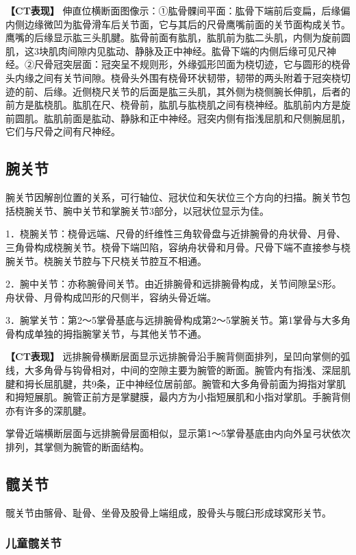 \textbf{【CT表现】}
伸直位横断面图像示：①肱骨髁间平面：肱骨下端前后变扁，后缘偏内侧边缘微凹为肱骨滑车后关节面，它与其后的尺骨鹰嘴前面的关节面构成关节。鹰嘴的后缘显示肱三头肌腱。肱骨前面有肱肌，肱肌前为肱二头肌，内侧为旋前圆肌，这3块肌肉间隙内见肱动、静脉及正中神经。肱骨下端的内侧后缘可见尺神经。②尺骨冠突层面：冠突呈不规则形，外缘弧形凹面为桡切迹，它与圆形的桡骨头内缘之间有关节间隙。桡骨头外围有桡骨环状韧带，韧带的两头附着于冠突桡切迹的前、后缘。近侧桡尺关节的后面是肱三头肌，其外侧为桡侧腕长伸肌，后者的前方是肱桡肌。肱肌在尺、桡骨前，肱肌与肱桡肌之间有桡神经。肱肌前内方是旋前圆肌。肱肌前面是肱动、静脉和正中神经。冠突内侧有指浅屈肌和尺侧腕屈肌，它们与尺骨之间有尺神经。

\subsection{腕关节}

腕关节因解剖位置的关系，可行轴位、冠状位和矢状位三个方向的扫描。腕关节包括桡腕关节、腕中关节和掌腕关节3部分，以冠状位显示为佳。

1．桡腕关节：桡骨远端、尺骨的纤维性三角软骨盘与近排腕骨的舟状骨、月骨、三角骨构成桡腕关节。桡骨下端凹陷，容纳舟状骨和月骨。尺骨下端不直接参与桡腕关节。桡腕关节腔与下尺桡关节腔互不相通。

2．腕中关节：亦称腕骨间关节。由近排腕骨和远排腕骨构成，关节间隙呈S形。舟状骨、月骨构成凹形的尺侧半，容纳头骨近端。

3．腕掌关节：第2～5掌骨基底与远排腕骨构成第2～5掌腕关节。第1掌骨与大多角骨构成单独的拇指腕掌关节，与其他关节不通。

\textbf{【CT表现】}
远排腕骨横断层面显示远排腕骨沿手腕背侧面排列，呈凹向掌侧的弧线，大多角骨与钩骨相对，中间的空隙主要为腕管的断面。腕管内有指浅、深屈肌腱和拇长屈肌腱，共9条，正中神经位居前部。腕管和大多角骨前面为拇指对掌肌和拇短展肌。腕管正前方是掌腱膜，最内方为小指短展肌和小指对掌肌。手腕背侧亦有许多的深肌腱。

掌骨近端横断层面与远排腕骨层面相似，显示第1～5掌骨基底由内向外呈弓状依次排列，其掌侧为腕管的断面结构。

\subsection{髋关节}

髋关节由髂骨、耻骨、坐骨及股骨上端组成，股骨头与髋臼形成球窝形关节。

\subsubsection{儿童髋关节}

